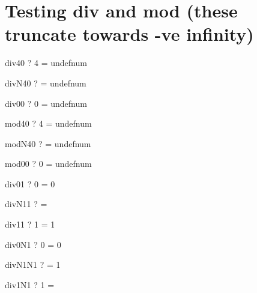 \documentclass{article}
\begin{document}
\section{Testing div and mod   (these truncate towards -ve infinity)}

\begin{theorem}{div40}  \vdash?   4  = undefnum \end{theorem}
\begin{theorem}{divN40} \vdash?     = undefnum \end{theorem}
\begin{theorem}{div00}  \vdash?   0  = undefnum \end{theorem}

\begin{theorem}{mod40}  \vdash?   4  = undefnum \end{theorem}
\begin{theorem}{modN40} \vdash?     = undefnum \end{theorem}
\begin{theorem}{mod00}  \vdash?   0  = undefnum \end{theorem}

\begin{theorem}{div01}  \vdash?   0  = 0 \end{theorem}
\begin{theorem}{divN11} \vdash?     =  \end{theorem}
\begin{theorem}{div11}  \vdash?   1  = 1 \end{theorem}
\begin{theorem}{div0N1} \vdash?   0 \div {} = 0 \end{theorem}
\begin{theorem}{divN1N1} \vdash?    \div {} = 1 \end{theorem}
\begin{theorem}{div1N1}  \vdash?   1 \div {} =  \end{theorem}
\end{document}
